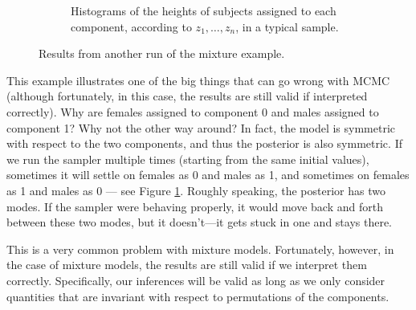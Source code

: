 \documentclass[12pt]{article}
\begin{document}
\begin{figure}
\begin{subfigure}[t]{1\textwidth}
        \caption{Histograms of the heights of subjects assigned to each component, according to $z_1,\ldots,z_n$, in a typical sample.}
    \end{subfigure}
    \vspace{.5em}
    \caption{Results from another run of the mixture example.}
    \label{figure:mix-b}
\end{figure}

This example illustrates one of the big things that can go wrong with MCMC (although fortunately, in this case, the results are still valid if interpreted correctly). Why are females assigned to component 0 and males assigned to component 1? Why not the other way around? In fact, the model is symmetric with respect to the two components, and thus the posterior is also symmetric. If we run the sampler multiple times (starting from the same initial values), sometimes it will settle on females as 0 and males as 1, and sometimes on females as 1 and males as 0 --- see Figure \ref{figure:mix-b}. Roughly speaking, the posterior has two modes. If the sampler were behaving properly, it would move back and forth between these two modes, but it doesn't---it gets stuck in one and stays there.

This is a very common problem with mixture models. Fortunately, however, in the case of mixture models, the results are still valid if we interpret them correctly. Specifically, our inferences will be valid as long as we only consider quantities that are invariant with respect to permutations of the components.




\newpage
\end{document}
